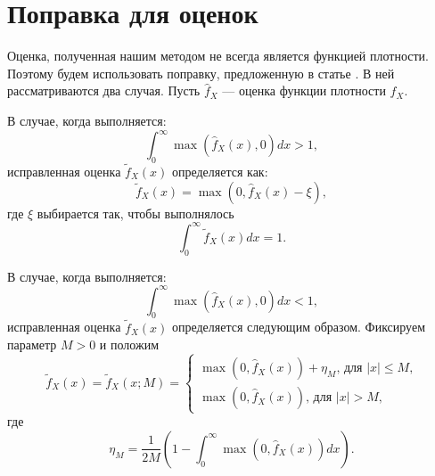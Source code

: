 \documentclass[../paper.tex]{subfiles}
\begin{document}
\section{Поправка для оценок}\label{correction}
Оценка, полученная нашим методом не всегда является функцией плотности.
Поэтому будем использовать поправку, предложенную в статье \cite{correction-of-density-estimation}.
В ней рассматриваются два случая. Пусть $\hat{f}_X$ --- оценка функции плотности $f_X$.

В случае, когда выполняется:
\[
	\int_0^\infty \max(\hat{f}_X(x), 0) dx > 1
,\]
исправленная оценка $\tilde{f}_X(x)$ определяется как:
\[
	\tilde{f}_X(x) = \max(0, \hat{f}_X(x) - \xi),
\]
где $\xi$ выбирается так, чтобы выполнялось
\[
	\int_0^\infty \tilde{f}_X(x) dx = 1
.\]

В случае, когда выполняется:
\[
	\int_0^\infty \max(\hat{f}_X(x), 0) dx < 1
,\]
исправленная оценка $\tilde{f}_X(x)$ определяется следующим образом. Фиксируем параметр $M > 0$ и положим
\[
	\tilde{f}_X(x)
	= \tilde{f}_X(x; M) =
	\begin{cases}
		\max(0, \hat{f}_X(x)) + \eta_M \text{, для $|x| \leqslant M$,} \\
		\max(0, \hat{f}_X(x)) \text{, для $|x| > M$,}
	\end{cases}
\]
где
\[
  \eta_M = \frac{1}{2M} \left( 1 - \int_0^\infty \max(0, \hat{f}_X(x)) dx \right)
.\]
\end{document}
